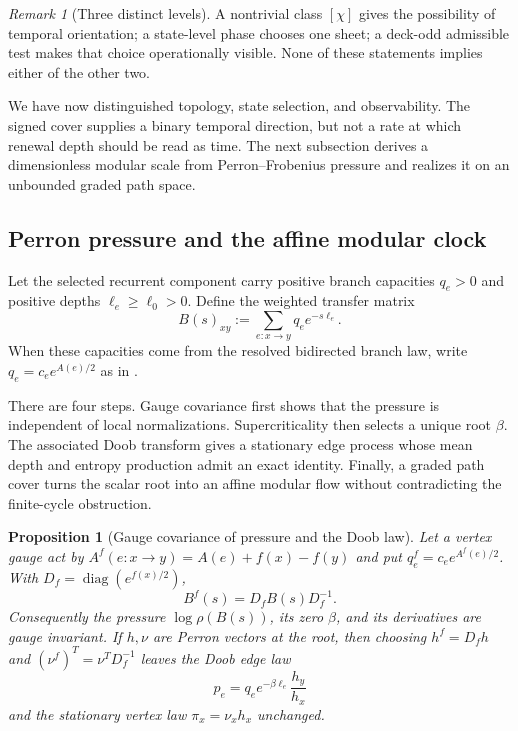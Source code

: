 \documentclass[11pt]{article}
\newtheorem{proposition}[theorem]{Proposition}
\theoremstyle{definition}
\theoremstyle{remark}
\newtheorem{remark}[theorem]{Remark}
\begin{document}
\begin{remark}[Three distinct levels]
A nontrivial class $[\chi]$ gives the possibility of temporal orientation; a
state-level phase chooses one sheet; a deck-odd admissible test makes that
choice operationally visible.  None of these statements implies either of the
other two.
\end{remark}

We have now distinguished topology, state selection, and observability.  The
signed cover supplies a binary temporal direction, but not a rate at which renewal
depth should be read as time.  The next subsection derives a dimensionless
modular scale from Perron--Frobenius pressure and realizes it on an unbounded
graded path space.

\subsection{Perron pressure and the affine modular clock}

Let the selected recurrent component carry positive branch capacities
$q_e>0$ and positive depths $\ell_e\ge\ell_0>0$.  Define the weighted transfer
matrix
\[
 B(s)_{xy}:=\sum_{e:x\to y}q_e e^{-s\ell_e}.
\]
When these capacities come from the resolved bidirected branch law, write
$q_e=c_e e^{A(e)/2}$ as in .

There are four steps.  Gauge covariance first shows that the pressure is
independent of local normalizations.  Supercriticality then selects a unique root
$\beta$.  The associated Doob transform gives a stationary edge process whose
mean depth and entropy production admit an exact identity.  Finally, a graded path
cover turns the scalar root into an affine modular flow without contradicting the
finite-cycle obstruction.

\begin{proposition}[Gauge covariance of pressure and the Doob law]
\label{prop:pressure-gauge-invariance}
Let a vertex gauge act by
$A^f(e:x\to y)=A(e)+f(x)-f(y)$ and put
$q_e^f=c_e e^{A^f(e)/2}$.  With
$D_f=\operatorname{diag}(e^{f(x)/2})$,
\[
 B^f(s)=D_f B(s)D_f^{-1}.
\]
Consequently the pressure $\log\rho(B(s))$, its zero $\beta$, and its
derivatives are gauge invariant.  If $h,\nu$ are Perron vectors at the root,
then choosing $h^f=D_f h$ and $(\nu^f)^T=\nu^T D_f^{-1}$ leaves the Doob edge
law
\[
 p_e=q_e e^{-\beta\ell_e}\frac{h_y}{h_x}
\]
and the stationary vertex law $\pi_x=\nu_x h_x$ unchanged.
\end{proposition}
\end{document}
